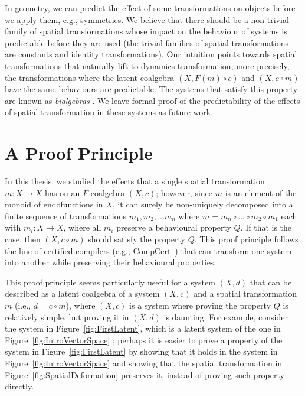 In geometry, we can predict the effect of some transformations on objects before we apply them, e.g., symmetries. We believe that there should be a non-trivial family of spatial transformations whose impact on the behaviour of systems is predictable before they are used (the trivial families of spatial transformations are constants and identity transformations). Our intuition points towards spatial transformations that naturally lift to dynamics transformation; more precisely, the transformations where the latent coalgebra $(X, F(m)\circ c)$ and $(X,c\circ m)$ have the same behaviours are predictable. The systems that satisfy this property are known as \emph{bialgebras} \cite{JacobsBook}. We leave formal proof of the predictability of the effects of spatial transformation in these systems as future work.

\section{A Proof Principle}
In this thesis, we studied the effects that a single spatial transformation $m\colon X\rightarrow X$ has on an $F$-coalgebra $(X,c)$; however, since $m$ is an element of the monoid of endofunctions in $X$, it can surely be non-uniquely decomposed into a finite sequence of transformations $m_1, m_2, \ldots m_n$ where $m=m_n\circ\ldots \circ m_2\circ m_1$ each with $m_i\colon X\rightarrow X$, where all $m_i$ preserve a behavioural property $Q$. If that is the case, then $(X,c\circ m)$ should satisfy the property $Q$. This proof principle follows the line of certified compilers (e.g., CompCert~\cite{CompCert}) that can transform one system into another while preserving their behavioural properties.

This proof principle seems particularly useful for a system $(X,d)$ that can be described as a latent coalgebra of a system $(X,c)$ and a spatial transformation $m$ (i.e., $d=c\circ m$), where $(X,c)$ is a system where proving the property $Q$ is relatively simple, but proving it in $(X,d)$ is daunting. 
For example, consider the system in Figure~\ref{fig:FirstLatent}, which is a latent system of the one in Figure~\ref{fig:IntroVectorSpace}%
; perhaps it is easier to prove a property of the system in Figure~\ref{fig:FirstLatent} by showing that it holds in the system in Figure~\ref{fig:IntroVectorSpace} and showing that the spatial transformation in Figure~\ref{fig:SpatialDeformation} preserves it, instead of proving such property directly. 


